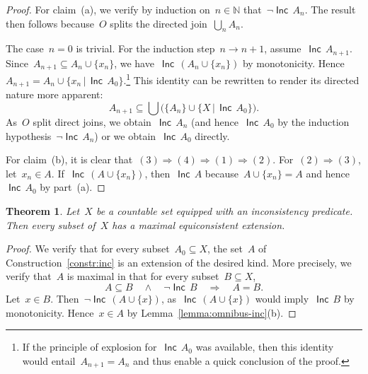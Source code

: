 \documentclass[com,11pt,crcready]{iosart2x}
\theoremstyle{definition}
\theoremstyle{plain}
\newtheorem{theorem}[definition]{Theorem}
\theoremstyle{remark}
\newcommand{\Incbare}{\mathsf{Inc}}
\newcommand{\Inc}[1]{\operatorname{\Incbare}\,#1}
\newcommand{\?}{\,{:}\,}
\newcommand{\NN}{\mathbb{N}}
\renewcommand{\_}{\mathpunct{.}\,}
\begin{document}
\begin{proof}For claim~(a), we verify by induction on~$n \in \NN$ that~$\neg
\Inc{A_n}$. The result then follows because~$O$ splits the directed join~$\bigcup_n A_n$.

The case~$n = 0$ is trivial. For the induction step~$n \to n+1$,
assume~$\Inc{A_{n+1}}$. Since~$A_{n+1} \subseteq A_n \cup \{x_n\}$, we
have~$\Inc{(A_n \cup \{ x_n \})}$ by monotonicity. Hence~$A_{n+1} = A_n \cup \{ x_n \,|\, \Inc{A_0}
\}$.\footnote{If the principle of explosion for~$\Inc{A_0}$ was available, then
this identity would entail~$A_{n+1} = A_n$ and thus enable a quick conclusion
of the proof.} This identity can be rewritten to render its directed nature
more apparent:
\[ A_{n+1} \subseteq \bigcup \bigl(\{A_n\} \cup \{X \,|\, \Inc{A_0}\}\bigr). \]
As~$O$ split direct joins, we obtain~$\Inc{A_n}$ (and hence~$\Inc{A_0}$ by the
induction hypothesis~$\neg \Inc{A_n}$) or we obtain~$\Inc{A_0}$ directly.

For claim~(b), it is clear that~$(3) \Rightarrow (4) \Rightarrow (1) \Rightarrow
(2)$. For~$(2) \Rightarrow (3)$, let~$x_n \in A$.
If~$\Inc{(A\cup\{x_n\})}$, then~$\Inc{A}$ because~$A\cup\{x_n\}=A$ and hence~$\Inc{A_0}$
by part~(a).
\end{proof}

\begin{theorem}\label{thm:max-inc-countable}Let~$X$ be a countable set equipped
with an inconsistency predicate. Then every subset of~$X$ has a maximal
equiconsistent extension.\end{theorem}

\begin{proof}We verify that for every subset~$A_0 \subseteq X$, the set~$A$ of
Construction~\ref{constr:inc} is an extension of the desired kind. More
precisely, we verify that~$A$ is maximal in that for every subset~$B \subseteq X$,
\[ A \subseteq B \quad\wedge\quad \neg \Inc{B} \quad\Longrightarrow\quad A = B. \]
Let~$x \in B$. Then~$\neg \Inc{(A \cup \{ x \})}$, as~$\Inc{(A \cup \{x\})}$
would imply~$\Inc{B}$ by monotonicity. Hence~$x \in A$ by
Lemma~\ref{lemma:omnibus-inc}(b).
\end{proof}
\end{document}
